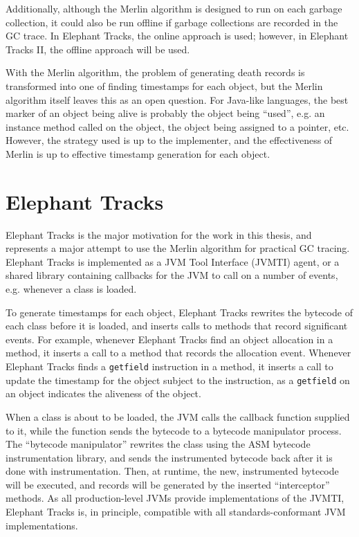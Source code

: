 Additionally, although the Merlin algorithm is designed to run on each garbage collection,
it could also be run offline if garbage collections are recorded in the GC trace. In Elephant Tracks, the online
approach is used; however, in Elephant Tracks II, the offline approach will be used.

With the Merlin algorithm, the problem of generating death records is transformed into one of finding timestamps
for each object, but the Merlin algorithm itself leaves this as an open question. For Java-like languages, the
best marker of an object being alive is probably the object being ``used'', e.g. an instance method called on the
object, the object being assigned to a pointer, etc. However, the strategy used is up to the implementer, and
the effectiveness of Merlin is up to effective timestamp generation for each object.

\section{Elephant Tracks}
Elephant Tracks \citep{ElephantTracks} is the major motivation for the work in this thesis, and represents a major attempt
to use the Merlin algorithm for practical GC tracing. Elephant Tracks is implemented as a JVM Tool Interface (JVMTI) agent, or a shared library
containing callbacks for the JVM to call on a number of events, e.g. whenever a class is loaded.

To generate timestamps for each object, Elephant Tracks rewrites the bytecode of each class before it is loaded, and inserts
calls to methods that record significant events. For example, whenever Elephant Tracks find an object allocation in a method,
it inserts a call to a method that records the allocation event. Whenever Elephant Tracks finds a \texttt{getfield} instruction
in a method, it inserts a call to update the timestamp for the object subject to the instruction, as a \texttt{getfield} on an
object indicates the aliveness of the object.

When a class is about to be loaded, the JVM calls the callback function supplied to it,
while the function sends the bytecode to a bytecode manipulator process. The ``bytecode manipulator'' rewrites the class using
the ASM bytecode instrumentation library, and sends the instrumented bytecode back after it is done with instrumentation. Then, at
runtime, the new, instrumented bytecode will be executed, and records will be generated by the inserted ``interceptor'' methods. As
all production-level JVMs provide implementations of the JVMTI, Elephant Tracks is, in principle, compatible with all standards-conformant
JVM implementations.


